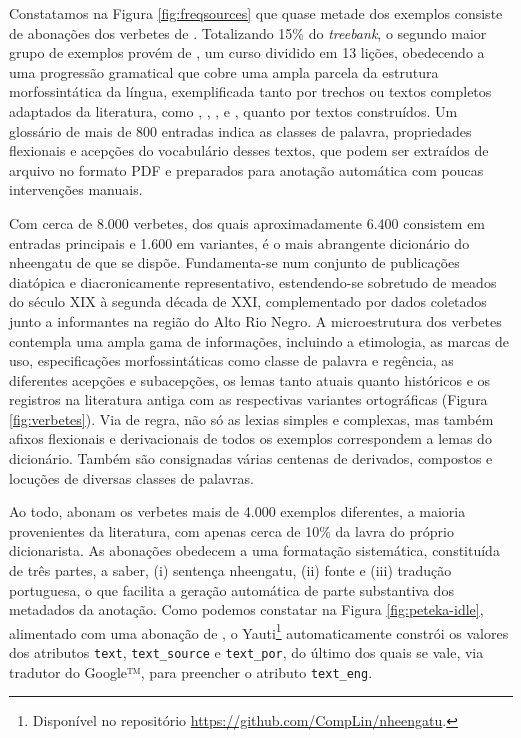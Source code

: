 \documentclass[portuguese]{textolivre}
\newcommand{\tb}{\textit{treebank}}
\begin{document}
Constatamos na Figura \ref{fig:freqsources} que quase metade dos exemplos consiste de abonações dos verbetes de \textcite{avila2021}. Totalizando 15\% do \tb, o segundo maior grupo de exemplos provém de \textcite{navarro2016}, um curso dividido em 13 lições, obedecendo a uma progressão gramatical que cobre uma ampla parcela da estrutura morfossintática da língua, exemplificada tanto por trechos ou textos completos adaptados da literatura, como \textcite{magalhaes1876}, \textcite{rodrigues1890}, \textcite{stradelli1929}, \textcite{Amorim1928} e \textcite{cruz2011}, quanto por textos construídos. Um glossário de mais de 800 entradas indica as classes de palavra, propriedades flexionais e acepções do vocabulário desses textos, que podem ser extraídos de arquivo no formato PDF e preparados para anotação automática com poucas intervenções manuais.  

Com cerca de 8.000 verbetes, dos quais aproximadamente 6.400 consistem em entradas principais e 1.600 em variantes, \textcite{avila2021} é o mais abrangente dicionário do nheengatu de que se dispõe. Fundamenta-se num conjunto de publicações diatópica e diacronicamente representativo, estendendo-se sobretudo de meados do século XIX à segunda década de XXI, complementado por dados coletados junto a informantes na região do Alto Rio Negro. A microestrutura dos verbetes contempla uma ampla gama de informações, incluindo a etimologia, as marcas de uso, especificações morfossintáticas como classe de palavra e regência, as diferentes acepções e subacepções, os lemas tanto atuais quanto históricos e os registros na literatura antiga com as respectivas variantes ortográficas (Figura \ref{fig:verbetes}). Via de regra, não só as lexias simples e complexas, mas também afixos flexionais e derivacionais de todos os exemplos correspondem a lemas do dicionário. Também são consignadas várias centenas de derivados, compostos e locuções de diversas classes de palavras.

Ao todo, abonam os verbetes mais de 4.000 exemplos diferentes, a maioria provenientes da literatura, com apenas cerca de 10\% da lavra do próprio dicionarista. As abonações obedecem a uma formatação sistemática, constituída de três partes, a saber, (i) sentença nheengatu, (ii) fonte e (iii) tradução portuguesa, o que facilita a geração automática de parte substantiva dos metadados da anotação. Como podemos constatar na Figura \ref{fig:peteka-idle}, alimentado com uma abonação de \textcite{avila2021}, o Yauti\footnote{Disponível no repositório \url{https://github.com/CompLin/nheengatu}.} automaticamente constrói os valores dos atributos \texttt{text}, \texttt{text\_source} e \texttt{text\_por}, do último dos quais se vale, via tradutor do Google™, para preencher o atributo \texttt{text\_eng}.
\end{document}
